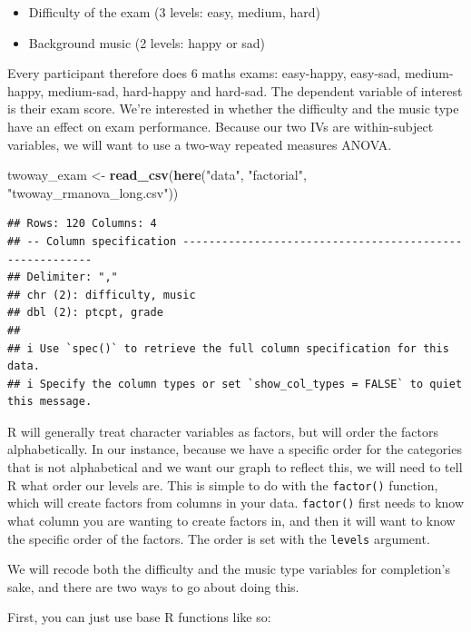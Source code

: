 \documentclass[
]{book}
\newenvironment{Shaded}{\begin{snugshade}}{\end{snugshade}}
\newcommand{\FunctionTok}[1]{\textcolor[rgb]{0.13,0.29,0.53}{\textbf{#1}}}
\newcommand{\NormalTok}[1]{#1}
\newcommand{\OtherTok}[1]{\textcolor[rgb]{0.56,0.35,0.01}{#1}}
\newcommand{\StringTok}[1]{\textcolor[rgb]{0.31,0.60,0.02}{#1}}
\providecommand{\tightlist}{%
  \setlength{\itemsep}{0pt}\setlength{\parskip}{0pt}}
\begin{document}
\begin{itemize}
\tightlist
\item
  Difficulty of the exam (3 levels: easy, medium, hard)
\item
  Background music (2 levels: happy or sad)
\end{itemize}

Every participant therefore does 6 maths exams: easy-happy, easy-sad, medium-happy, medium-sad, hard-happy and hard-sad. The dependent variable of interest is their exam score. We're interested in whether the difficulty and the music type have an effect on exam performance. Because our two IVs are within-subject variables, we will want to use a two-way repeated measures ANOVA.

\begin{Shaded}
\begin{Highlighting}[]
\NormalTok{twoway\_exam }\OtherTok{\textless{}{-}} \FunctionTok{read\_csv}\NormalTok{(}\FunctionTok{here}\NormalTok{(}\StringTok{"data"}\NormalTok{, }\StringTok{"factorial"}\NormalTok{, }\StringTok{"twoway\_rmanova\_long.csv"}\NormalTok{))}
\end{Highlighting}
\end{Shaded}

\begin{verbatim}
## Rows: 120 Columns: 4
## -- Column specification --------------------------------------------------------
## Delimiter: ","
## chr (2): difficulty, music
## dbl (2): ptcpt, grade
## 
## i Use `spec()` to retrieve the full column specification for this data.
## i Specify the column types or set `show_col_types = FALSE` to quiet this message.
\end{verbatim}

R will generally treat character variables as factors, but will order the factors alphabetically. In our instance, because we have a specific order for the categories that is not alphabetical and we want our graph to reflect this, we will need to tell R what order our levels are. This is simple to do with the \texttt{factor()} function, which will create factors from columns in your data. \texttt{factor()} first needs to know what column you are wanting to create factors in, and then it will want to know the specific order of the factors. The order is set with the \texttt{levels} argument.

We will recode both the difficulty and the music type variables for completion's sake, and there are two ways to go about doing this.

First, you can just use base R functions like so:
\end{document}
